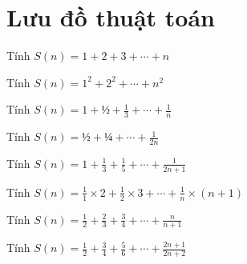 
\chapter{Lưu đồ thuật toán}
\hypertarget{localtoc\thechapter}{}
\localtoc    

\begin{problem}
    Tính $S(n) = 1 + 2 + 3 + \cdots + n$ 
\end{problem}


\begin{problem}
    Tính $S(n) = 1^2 + 2^2 + \cdots + n^2$
\end{problem}


\begin{problem}
    Tính $S(n) = 1 + ½ + \frac{1}{3} + \cdots + \frac{1}{n}$
\end{problem}


\begin{problem}
    Tính $S(n) = ½ + ¼ + \cdots + \frac{1}{2n}$
\end{problem}


\begin{problem}
    Tính $S(n) = 1 + \frac{1}{3} + \frac{1}{5} + \cdots + \frac{1}{2n + 1}$
\end{problem}


\begin{problem}
   Tính $S(n) = \frac{1}{1}×2 + \frac{1}{2}×3 +\cdots+ \frac{1}{n}\times(n + 1)$
\end{problem}


\begin{problem}
    Tính $S(n) = \frac{1}{2} + \frac{2}{3} + \frac{3}{4} + \cdots + \frac{n}{n + 1}$
\end{problem}


\begin{problem}
    Tính $S(n) = \frac{1}{2} + \frac{3}{4} + \frac{5}{6} + \cdots + \frac{2n + 1}{2n + 2} $
\end{problem}


